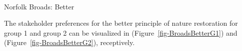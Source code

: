 \documentclass[
  12pt,
  letterpaper,
  DIV=11,
  numbers=noendperiod]{scrartcl}
\makeatletter
\let\oldparagraph\paragraph
\renewcommand{\paragraph}{
    \@ifstar
      \xxxParagraphStar
      \xxxParagraphNoStar
  }
\newcommand{\xxxParagraphStar}[1]{\oldparagraph*{#1}\mbox{}}
\newcommand{\xxxParagraphNoStar}[1]{\oldparagraph{#1}\mbox{}}
\makeatother
\begin{document}
\paragraph{Norfolk Broads: Better}\label{norfolk-broads-better}

The stakeholder preferences for the better principle of nature
restoration for group 1 and group 2 can be visualized in
(Figure~\ref{fig-BroadsBetterG1}) and (Figure~\ref{fig-BroadsBetterG2}),
receptively.

\begin{figure}[H]

\end{figure}
\end{document}
